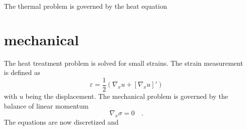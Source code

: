 The thermal problem is governed by the heat equation 


\section{mechanical}
The heat treatment problem is solved for small strains. The strain measurement is defined as 
\begin{equation}
	\varepsilon = \frac{1}{2}\left( \nabla_x u + [\nabla_x u]' \right)
\end{equation}
with $u$ being the displacement. The mechanical problem is governed by the balance of linear momentum 
\begin{equation}
	\nabla_x \sigma = 0 \quad. 
\end{equation}
The equations are now discretized and 
